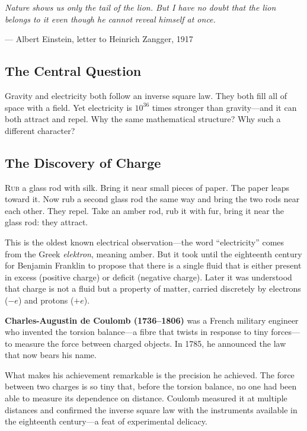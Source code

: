 \documentclass[12pt, a4paper, twoside]{book}
\theoremstyle{disc}
\begin{document}
\epigraph{\itshape
  Nature shows us only the tail of the lion. But I have no doubt that
  the lion belongs to it even though he cannot reveal himself at once.
}{--- Albert Einstein, letter to Heinrich Zangger, 1917}

\subsection{The Central Question}

\begin{puzzlebox}
Gravity and electricity both follow an inverse square law. They both fill all of space with a field. Yet electricity is $10^{36}$ times stronger than gravity---and it can both attract and repel. Why the same mathematical structure? Why such a different character?
\end{puzzlebox}

\subsection{The Discovery of Charge}

\lettrine[lines=3,loversize=0.08]{\textcolor{accent}{R}}{ub} a glass rod with silk. Bring it near small pieces of paper. The paper leaps toward it. Now rub a second glass rod the same way and bring the two rods near each other. They repel. Take an amber rod, rub it with fur, bring it near the glass rod: they attract.

This is the oldest known electrical observation---the word ``electricity'' comes from the Greek \textit{elektron}, meaning amber. But it took until the eighteenth century for Benjamin Franklin to propose that there is a single fluid that is either present in excess (positive charge) or deficit (negative charge). Later it was understood that charge is not a fluid but a property of matter, carried discretely by electrons ($-e$) and protons ($+e$).

\begin{historybox}
\textbf{Charles-Augustin de Coulomb (1736--1806)} was a French military engineer who invented the torsion balance---a fibre that twists in response to tiny forces---to measure the force between charged objects. In 1785, he announced the law that now bears his name.

What makes his achievement remarkable is the precision he achieved. The force between two charges is so tiny that, before the torsion balance, no one had been able to measure its dependence on distance. Coulomb measured it at multiple distances and confirmed the inverse square law with the instruments available in the eighteenth century---a feat of experimental delicacy.
\end{historybox}
\end{document}
